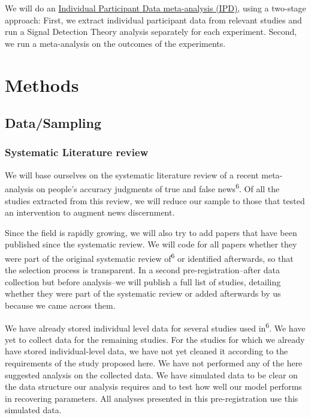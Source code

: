 \documentclass[
  man,mask,floatsintext]{apa6}
\begin{document}
We will do an \href{https://training.cochrane.org/handbook/current/chapter-26}{Individual Participant Data meta-analysis (IPD)}, using a two-stage approach: First, we extract individual participant data from relevant studies and run a Signal Detection Theory analysis separately for each experiment. Second, we run a meta-analysis on the outcomes of the experiments.

\section{Methods}\label{methods}

\subsection{Data/Sampling}\label{datasampling}

\subsubsection{Systematic Literature review}\label{systematic-literature-review}

We will base ourselves on the systematic literature review of a recent meta-analysis on people's accuracy judgments of true and false news\textsuperscript{6}. Of all the studies extracted from this review, we will reduce our sample to those that tested an intervention to augment news discernment.

Since the field is rapidly growing, we will also try to add papers that have been published since the systematic review. We will code for all papers whether they were part of the original systematic review of\textsuperscript{6} or identified afterwards, so that the selection process is transparent. In a second pre-registration--after data collection but before analysis--we will publish a full list of studies, detailing whether they were part of the systematic review or added afterwards by us because we came across them.

We have already stored individual level data for several studies used in\textsuperscript{6}. We have yet to collect data for the remaining studies. For the studies for which we already have stored individual-level data, we have not yet cleaned it according to the requirements of the study proposed here. We have not performed any of the here suggested analysis on the collected data. We have simulated data to be clear on the data structure our analysis requires and to test how well our model performs in recovering parameters. All analyses presented in this pre-registration use this simulated data.
\end{document}
